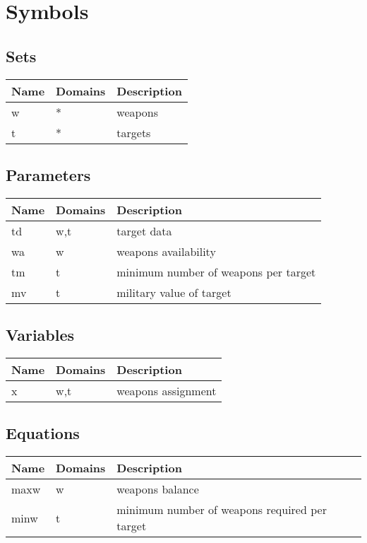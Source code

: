 \documentclass[11pt]{article}
\begin{document}
\section*{Symbols}


\subsection*{Sets}
\begin{tabularx}{\textwidth}{| l | l | X |}
\hline
\textbf{Name} & \textbf{Domains} & \textbf{Description}\\
\hline
\endhead

w & * & weapons\\
t & * & targets\\
\hline
\end{tabularx}
\subsection*{Parameters}
\begin{tabularx}{\textwidth}{| l | l | X |}
\hline
\textbf{Name} & \textbf{Domains} & \textbf{Description}\\
\hline
\endhead

td & w,t & target data\\
wa & w & weapons availability\\
tm & t & minimum number of weapons per target\\
mv & t & military value of target\\
\hline
\end{tabularx}
\subsection*{Variables}
\begin{tabularx}{\textwidth}{| l | l | X |}
\hline
\textbf{Name} & \textbf{Domains} & \textbf{Description}\\
\hline
\endhead

x & w,t & weapons assignment\\
\hline
\end{tabularx}
\subsection*{Equations}
\begin{tabularx}{\textwidth}{| l | l | X |}
\hline
\textbf{Name} & \textbf{Domains} & \textbf{Description}\\
\hline
\endhead

maxw & w & weapons balance\\
minw & t & minimum number of weapons required per target\\
\hline
\end{tabularx}
\end{document}
